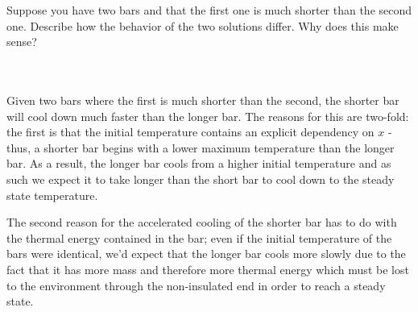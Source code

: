 Suppose you have two bars and that the first one is much shorter than the second one. Describe how the behavior of the
two solutions differ. Why does this make sense?
\begin{solution}\ \\\\
    Given two bars where the first is much shorter than the second, the shorter bar will cool down much faster than the
    longer bar. The reasons for this are two-fold: the first is that the initial temperature contains an explicit 
    dependency on $x$ - thus, a shorter bar begins with a lower maximum temperature than the longer bar. As a result, 
    the longer bar cools from a higher initial temperature and as such we expect it to take longer than the short bar 
    to cool down to the steady state temperature. 

    The second reason for the accelerated cooling of the shorter bar has to do with the thermal energy contained in the
    bar; even if the initial temperature of the bars were identical, we'd expect that the longer bar cools more slowly
    due to the fact that it has more mass and therefore more thermal energy which must be lost to the environment 
    through the non-insulated end in order to reach a steady state.
    \ \\
\end{solution}